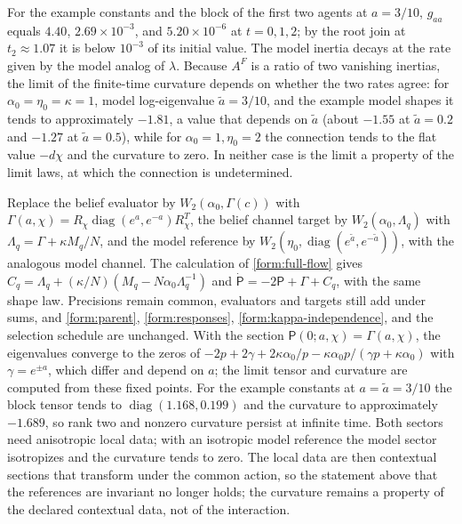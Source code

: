 For the example constants and the block of the first two agents at $a=3/10$, $g_{aa}$ equals $4.40$, $2.69\times10^{-3}$, and $5.20\times10^{-6}$ at $t=0,1,2$; by the root join at $t_2\approx1.07$ it is below $10^{-3}$ of its initial value. The model inertia decays at the rate given by the model analog of $\lambda$. Because $A^F$ is a ratio of two vanishing inertias, the limit of the finite-time curvature depends on whether the two rates agree: for $\alpha_0=\eta_0=\kappa=1$, model log-eigenvalue $\tilde a=3/10$, and the example model shapes it tends to approximately $-1.81$, a value that depends on $\tilde a$ (about $-1.55$ at $\tilde a=0.2$ and $-1.27$ at $\tilde a=0.5$), while for $\alpha_0=1,\eta_0=2$ the connection tends to the flat value $-d\chi$ and the curvature to zero. In neither case is the limit a property of the limit laws, at which the connection is undetermined.

Replace the belief evaluator by $W_2(\alpha_0,\Gamma(c))$ with $\Gamma(a,\chi)=R_\chi\operatorname{diag}(e^a,e^{-a})R_\chi^T$, the belief channel target by $W_2(\alpha_0,\Lambda_q)$ with $\Lambda_q=\Gamma+\kappa M_q/N$, and the model reference by $W_2(\eta_0,\operatorname{diag}(e^{\tilde a},e^{-\tilde a}))$, with the analogous model channel. The calculation of \cref{form:full-flow} gives $C_q=\Lambda_q+(\kappa/N)(M_q-N\alpha_0\Lambda_q^{-1})$ and $\dot{\mathsf P}=-2\mathsf P+\Gamma+C_q$, with the same shape law. Precisions remain common, evaluators and targets still add under sums, and \cref{form:parent}, \cref{form:responses}, \cref{form:kappa-independence}, and the selection schedule are unchanged. With the section $\mathsf P(0;a,\chi)=\Gamma(a,\chi)$, the eigenvalues converge to the zeros of $-2p+2\gamma+2\kappa\alpha_0/p-\kappa\alpha_0p/(\gamma p+\kappa\alpha_0)$ with $\gamma=e^{\pm a}$, which differ and depend on $a$; the limit tensor and curvature are computed from these fixed points. For the example constants at $a=\tilde a=3/10$ the block tensor tends to $\operatorname{diag}(1.168,0.199)$ and the curvature to approximately $-1.689$, so rank two and nonzero curvature persist at infinite time. Both sectors need anisotropic local data; with an isotropic model reference the model sector isotropizes and the curvature tends to zero. The local data are then contextual sections that transform under the common action, so the statement above that the references are invariant no longer holds; the curvature remains a property of the declared contextual data, not of the interaction.

